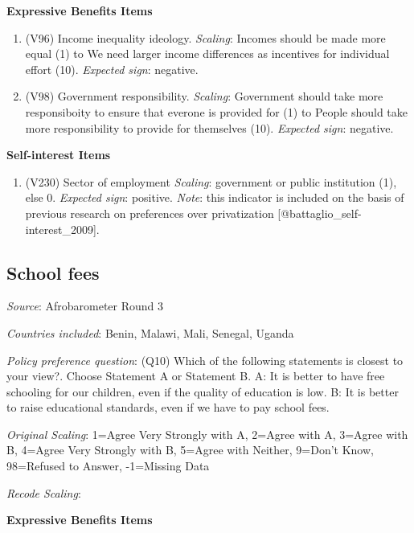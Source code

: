 \documentclass[]{article}
\begin{document}
\textbf{Expressive Benefits Items}

\begin{enumerate}
  \item (V96) Income inequality ideology. \textit{Scaling}: Incomes should be made more equal (1) to We need larger income differences as incentives for individual effort (10). \textit{Expected sign}: negative.
  \item (V98) Government responsibility. \textit{Scaling}: Government should take more responsiboity to ensure that everone is provided for (1) to People should take more responsibility to provide for themselves (10). \textit{Expected sign}: negative.
\end{enumerate}

\textbf{Self-interest Items }

\begin{enumerate}
 \item (V230) Sector of employment \textit{Scaling}: government or public institution (1), else 0. \textit{Expected sign}: positive. \textit{Note}: this indicator is included on the basis of previous research on preferences over privatization [@battaglio_self-interest_2009].
\end{enumerate}

\subsection{School fees}\label{school-fees}

\textit{Source}: Afrobarometer Round 3

\textit{Countries included}: Benin, Malawi, Mali, Senegal, Uganda

\textit{Policy preference question}: (Q10) Which of the following
statements is closest to your view?. Choose Statement A or Statement B.
A: It is better to have free schooling for our children, even if the
quality of education is low. B: It is better to raise educational
standards, even if we have to pay school fees.

\textit{Original Scaling}: 1=Agree Very Strongly with A, 2=Agree with A,
3=Agree with B, 4=Agree Very Strongly with B, 5=Agree with Neither,
9=Don't Know, 98=Refused to Answer, -1=Missing Data

\textit{Recode Scaling}:

\textbf{Expressive Benefits Items}
\end{document}
